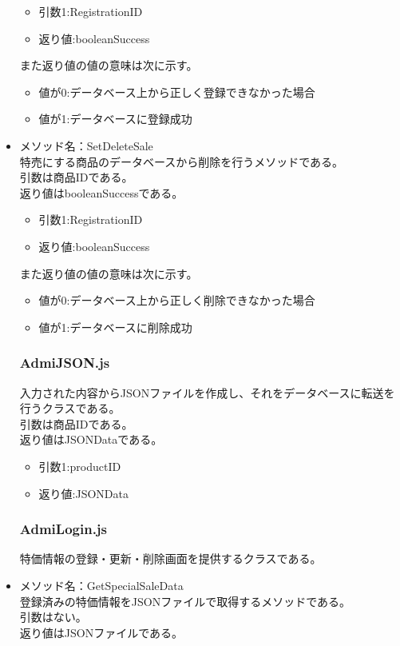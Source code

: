 \documentclass[a4j]{jarticle}
\begin{document}
\begin{itemize}
	\begin{itemize}
		\item 引数1:RegistrationID
		\item 返り値:booleanSuccess
	\end{itemize}
また返り値の値の意味は次に示す。
	\begin{itemize}
		\item 値が0:データベース上から正しく登録できなかった場合
		\item 値が1:データベースに登録成功
	\end{itemize}
\item メソッド名：SetDeleteSale\\
特売にする商品のデータベースから削除を行うメソッドである。\\
引数は商品IDである。\\
返り値はbooleanSuccessである。

	\begin{itemize}
		\item 引数1:RegistrationID
		\item 返り値:booleanSuccess
	\end{itemize}
また返り値の値の意味は次に示す。
	\begin{itemize}
		\item 値が0:データベース上から正しく削除できなかった場合
		\item 値が1:データベースに削除成功
	\end{itemize}
	\subsubsection{AdmiJSON.js}
入力された内容からJSONファイルを作成し、それをデータベースに転送を行うクラスである。\\
引数は商品IDである。\\
返り値はJSONDataである。
	\begin{itemize}
		\item 引数1:productID
		\item 返り値:JSONData
	\end{itemize}
\subsubsection{AdmiLogin.js}
特価情報の登録・更新・削除画面を提供するクラスである。
%
\item メソッド名：GetSpecialSaleData\\

登録済みの特価情報をJSONファイルで取得するメソッドである。\\
引数はない。\\
返り値はJSONファイルである。



\end{itemize}
\end{document}
